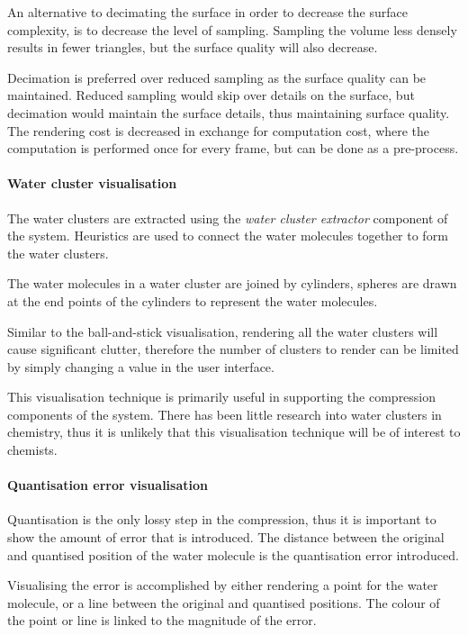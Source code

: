 An alternative to decimating the surface in order to decrease the surface
complexity, is to decrease the level of sampling. Sampling the volume less
densely results in fewer triangles, but the surface quality will also decrease.

Decimation is preferred over reduced sampling as the surface quality can be
maintained. Reduced sampling would skip over details on the surface, but
decimation would maintain the surface details, thus maintaining surface
quality. The rendering cost is decreased in exchange for computation cost,
where the computation is performed once for every frame, but can be done as a
pre-process.


\paragraph{Water cluster visualisation}

The water clusters are extracted using the \emph{water cluster extractor}
component of the system. Heuristics are used to connect the water molecules
together to form the water clusters.

The water molecules in a water cluster are joined by cylinders, spheres are
drawn at the end points of the cylinders to represent the water molecules.

Similar to the ball-and-stick visualisation, rendering all the water clusters
will cause significant clutter, therefore the number of clusters to render can
be limited by simply changing a value in the user interface.

This visualisation technique is primarily useful in supporting the compression
components of the system. There has been little research into water clusters in
chemistry, thus it is unlikely that this visualisation technique will be of
interest to chemists.


\paragraph{Quantisation error visualisation}

Quantisation is the only lossy step in the compression, thus it is important to
show the amount of error that is introduced. The distance between the original
and quantised position of the water molecule is the quantisation error
introduced.

Visualising the error is accomplished by either rendering a point for the water
molecule, or a line between the original and quantised positions. The colour of
the point or line is linked to the magnitude of the error.

